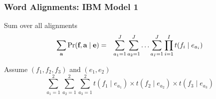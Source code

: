 %
%
%


\begin{frame}
\frametitle{Word Alignments: IBM Model 1}
\begin{block}{Sum over all alignments}
\begin{eqnarray*}
\sum_{\textbf{a}} \Pr(\textbf{f}, \textbf{a} \mid \textbf{e}) & = & 
\sum_{a_1 = 1}^J \sum_{a_2 = 1}^J \ldots \sum_{a_I = 1}^J \prod_{i=1}^I t(f_i \mid e_{a_i}) 
\end{eqnarray*}
\end{block}\pause
\begin{block}{Assume $(f_1, f_2, f_3)$ and $(e_1, e_2)$}
\[ \sum_{a_1=1}^2 \sum_{a_2=1}^2 \sum_{a_3=1}^2 t(f_1 \mid e_{a_1}) \times t(f_2 \mid e_{a_2}) \times t(f_3 \mid e_{a_3}) \]
\end{block}
\end{frame}

